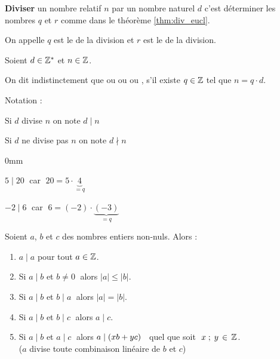 \medskip
\begin{definition}
\textbf{Diviser} un nombre relatif $n$ par un nombre naturel $d$ c'est déterminer les nombres $q$ et $r$ comme dans le théorème \ref*{thm:div_eucl}.

\medskip
On appelle $q$ est le  de la division et $r$ est le  de la division. 
\end{definition}




\begin{definition}
Soient $d\in \Z^{\ast}$ et $n\in \Z$.

\smallskip
On dit indistinctement que  ou  ou  ou , s'il existe $q\in\Z$ tel que $n=q\cdot d$.

\medskip
Notation : \begin{minipage}[t]{0.8\textwidth}
Si $d$ divise $n$ on note $d\mid n$

\smallskip
Si $d$ ne divise pas $n$ on note $d\nmid n$
\end{minipage}
\end{definition}



\begin{exemples}{0mm}
\item $5\mid 20\;$ car $\;20=5\cdot \underbrace{4}_{=q}$
\item $-2\mid 6\;$ car $\;6=(-2)\cdot \underbrace{(-3)}_{=q}$

\end{exemples}




\begin{proposition}
\label{prop_div_comb_lin}
Soient $a$, $b$ et $c$ des nombres entiers non-nuls. Alors :
\begin{enumerate}[label=\roman*)]
\item $a\mid a$ pour tout $a\in \Z$.
\item Si $a\mid b$ et $b\neq 0\;$ alors $|a|\leqslant |b|$.
\item Si $a\mid b$ et $b\mid a\;$ alors $|a|= |b|$.
\item Si $a\mid b$ et $b\mid c\;$ alors $a\mid c$.
\item Si $a\mid b$ et $a\mid c\;$ alors $a\mid (xb+yc) \eh{2}$ quel que soit $\eh{1} x\; ;\;y \,\in\, \Z$.
\\ {\footnotesize ($a$ divise toute combinaison linéaire de $b$ et $c$)}
\end{enumerate}
\end{proposition}

